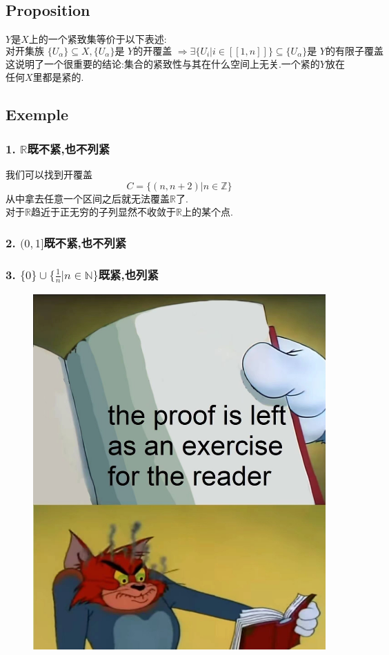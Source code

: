 \documentclass[12pt, a4paper, oneside]{ctexbook}
\newcommand{\R }{\mathbb{R}}%
\begin{document}
  \subsection{Proposition}
  $Y$是$X$上的一个紧致集等价于以下表述:
  $$
  \text{对开集族 }\{U_\alpha\}\subseteq X, \{U_\alpha\}\text{是 }Y\text{的开覆盖 }\Rightarrow
  \exists\{U_i|i\in[\![1,n]\!]\}\subseteq\{U_\alpha\}\text{是 }Y\text{的有限子覆盖 }
  $$
  这说明了一个很重要的结论:集合的紧致性与其在什么空间上无关.一个紧的$Y$放在任何$X$里都是紧的.
  \subsection{Exemple}
  \subsubsection{1.  $\R$既不紧,也不列紧}
  我们可以找到开覆盖
  $$
  C=\{(n,n+2)|n\in\mathbb{Z}\}
  $$
  从中拿去任意一个区间之后就无法覆盖$\R$了.\\
  对于$\R$趋近于正无穷的子列显然不收敛于$\R$上的某个点.
  \subsubsection{2.  $(0,1]$既不紧,也不列紧}
  \subsubsection{3.  $\{0\}\cup \{\frac{1}{n}|n\in\mathbb{N}\}$既紧,也列紧}
  \begin{figure}[H]%
    \centering
    \includegraphics[scale=0.2]{proofforreader.jpg}
  \end{figure}
\end{document}
